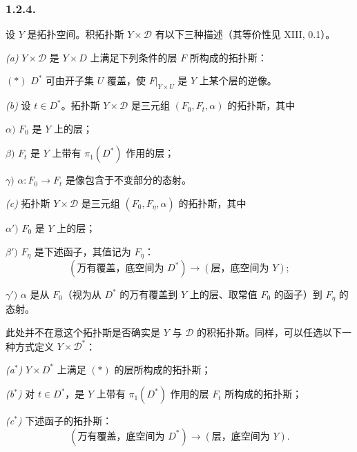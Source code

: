 \subsubsection*{1.2.4.}
设 $Y$ 是拓扑空间。积拓扑斯 $Y\times\mathcal D$ 有以下三种描述（其等价性见 XIII, 0.1）。

\medskip
\noindent\textit{(a)} $Y\times\mathcal D$ 是 $Y\times D$ 上满足下列条件的层 $F$ 所构成的拓扑斯：

\smallskip
\noindent $(*)$ $D^*$ 可由开子集 $U$ 覆盖，使 $F|_{Y\times U}$ 是 $Y$ 上某个层的逆像。

\medskip
\noindent\textit{(b)} 设 $t\in D^*$。拓扑斯 $Y\times\mathcal D$ 是三元组 $(F_0,F_t,\alpha)$ 的拓扑斯，其中

\smallskip
\noindent $\alpha)$ $F_0$ 是 $Y$ 上的层；

\noindent $\beta)$ $F_t$ 是 $Y$ 上带有 $\pi_1(D^*)$ 作用的层；

\noindent $\gamma)$ $\alpha:F_0\longrightarrow F_t$ 是像包含于不变部分的态射。

\medskip
\noindent\textit{(c)} 拓扑斯 $Y\times\mathcal D$ 是三元组 $(F_0,F_\eta,\alpha)$ 的拓扑斯，其中

\smallskip
\noindent $\alpha')$ $F_0$ 是 $Y$ 上的层；

\noindent $\beta')$ $F_\eta$ 是下述函子，其值记为 $F_{\bar\eta}$：
\[
(\text{万有覆盖，底空间为 }D^*)
\longrightarrow(\text{层，底空间为 }Y);
\]

\noindent $\gamma')$ $\alpha$ 是从 $F_0$（视为从 $D^*$ 的万有覆盖到 $Y$ 上的层、取常值 $F_0$ 的函子）到 $F_\eta$ 的态射。

此处并不在意这个拓扑斯是否确实是 $Y$ 与 $\mathcal D$ 的积拓扑斯。同样，可以任选以下一种方式定义 $Y\times\mathcal D^*$：

\medskip
\noindent\textit{(a$^*$)} $Y\times D^*$ 上满足 $(*)$ 的层所构成的拓扑斯；

\noindent\textit{(b$^*$)} 对 $t\in D^*$，是 $Y$ 上带有 $\pi_1(D^*)$ 作用的层 $F_t$ 所构成的拓扑斯；

\noindent\textit{(c$^*$)} 下述函子的拓扑斯：
\[
(\text{万有覆盖，底空间为 }D^*)
\longrightarrow(\text{层，底空间为 }Y).
\]

